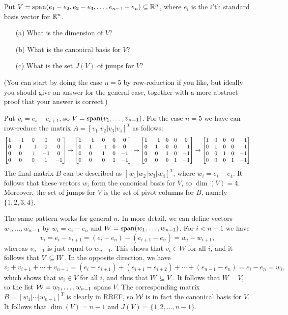 \documentclass[a4paper]{amsart}
\renewenvironment{solution}{\SolutionInline}{\endSolutionInline}
\begin{document}
\begin{exercise}\label{ex-jumps-ii}
 Put $V=\operatorname{span}(e_1-e_2,e_2-e_3,\dotsc,e_{n-1}-e_n)\subseteq{\mathbb{R}}^n$, where $e_i$
 is the $i$'th standard basis vector for ${\mathbb{R}}^n$.
 \begin{itemize}
  \item[(a)] What is the dimension of $V$?
  \item[(b)] What is the canonical basis for $V$?
  \item[(c)] What is the set $J(V)$ of jumps for $V$?
 \end{itemize}
 (You can start by doing the case $n=5$ by row-reduction if you like,
 but ideally you should give an answer for the general case, together
 with a more abstract proof that your answer is correct.)
\end{exercise}
\begin{solution}
 Put $v_i=e_i-e_{i+1}$, so $V=\operatorname{span}(v_1,\dotsc,v_{n-1})$.  
 For the case $n=5$ we have can row-reduce the matrix
 $A=[v_1|v_2|v_3|v_4]^T$ as follows:
 \[ 
   \left[\begin{matrix} 
    1&-1&0&0&0 \\
    0&1&-1&0&0 \\
    0&0&1&-1&0 \\
    0&0&0&1&-1
   \end{matrix}\right]
   \to 
   \left[\begin{matrix} 
    1&-1&0&0&0 \\
    0&1&-1&0&0 \\
    0&0&1&0&-1 \\
    0&0&0&1&-1
   \end{matrix}\right]
   \to 
   \left[\begin{matrix} 
    1&-1&0&0&0 \\
    0&1&0&0&-1 \\
    0&0&1&0&-1 \\
    0&0&0&1&-1
   \end{matrix}\right]
   \to 
   \left[\begin{matrix} 
    1&0&0&0&-1 \\
    0&1&0&0&-1 \\
    0&0&1&0&-1 \\
    0&0&0&1&-1
   \end{matrix}\right]
 \]
 The final matrix $B$ can be described as $[w_1|w_2|w_3|w_4]^T$, where
 $w_i=e_i-e_4$.  It follows that these vectors $w_i$ form the
 canonical basis for $V$, so $\dim(V)=4$.  Moreover, the set of jumps
 for $V$ is the set of pivot columns for $B$, namely $\{1,2,3,4\}$.

 The same pattern works for general $n$.  In more detail, we can
 define vectors $w_1,\dotsc,w_{n-1}$ by $w_i=e_i-e_n$ and
 $W=\operatorname{span}(w_1,\dotsc,w_{n-1})$.  For $i<n-1$ we have 
 \[ v_i = e_i-e_{i+1} = (e_i-e_n) - (e_{i+1}-e_n) = w_i-w_{i+1}, \]
 whereas $v_{n-1}$ is just equal to $w_{n-1}$.  This shows that
 $v_i\in W$ for all $i$, and it follows that $V\subseteq W$.  In the
 opposite direction, we have
 \[ v_i + v_{i+1} + \dotsb + v_{n-1} =
    (e_i-e_{i+1}) + (e_{i+1}-e_{i+2}) + \dotsb + (e_{n-1}-e_n) = 
    e_i - e_n = w_i,
 \]
 which shows that $w_i\in V$ for all $i$, and thus that $W\subseteq V$.  It
 follows that $W=V$, so the list $\mathcal{W}=w_1,\dotsc,w_{n-1}$ spans $V$.
 The corresponding matrix $B=[w_1|\dotsb|w_{n-1}]^T$ is clearly in
 RREF, so $\mathcal{W}$ is in fact the canonical basis for $V$.  It follows
 that $\dim(V)=n-1$ and $J(V)=\{1,2,\dotsc,n-1\}$.
\end{solution}
\end{document}

